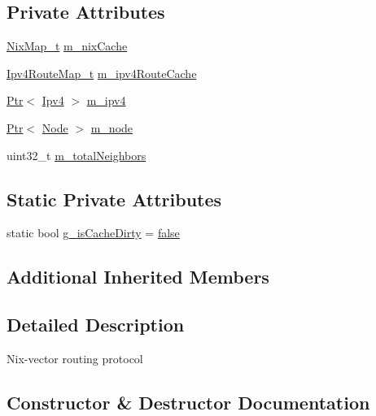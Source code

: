 \subsection*{Private Attributes}
\begin{DoxyCompactItemize}
\item 
\hyperlink{group__nix-vector-routing_gaa552b6157fc91cb632b9007a4cef9bc7}{Nix\+Map\+\_\+t} \hyperlink{classns3_1_1Ipv4NixVectorRouting_a394e830e592aa6ef064be362150219f2}{m\+\_\+nix\+Cache}
\item 
\hyperlink{group__nix-vector-routing_ga0a2084e70cce2de3dcfab5da0ec63bdd}{Ipv4\+Route\+Map\+\_\+t} \hyperlink{classns3_1_1Ipv4NixVectorRouting_aeb85361b66489c60851f72f1493fdee7}{m\+\_\+ipv4\+Route\+Cache}
\item 
\hyperlink{classns3_1_1Ptr}{Ptr}$<$ \hyperlink{classns3_1_1Ipv4}{Ipv4} $>$ \hyperlink{classns3_1_1Ipv4NixVectorRouting_a215cb71f30d85df9ec7176ca22620519}{m\+\_\+ipv4}
\item 
\hyperlink{classns3_1_1Ptr}{Ptr}$<$ \hyperlink{classns3_1_1Node}{Node} $>$ \hyperlink{classns3_1_1Ipv4NixVectorRouting_a329265b09f4d85bac6ec9bd0ec2daa92}{m\+\_\+node}
\item 
uint32\+\_\+t \hyperlink{classns3_1_1Ipv4NixVectorRouting_a96620dedcc6c052265c3c53aa14e4f6b}{m\+\_\+total\+Neighbors}
\end{DoxyCompactItemize}
\subsection*{Static Private Attributes}
\begin{DoxyCompactItemize}
\item 
static bool \hyperlink{classns3_1_1Ipv4NixVectorRouting_a7b75edeb473c9fe1595b59d9800c5bab}{g\+\_\+is\+Cache\+Dirty} = \hyperlink{lte__cqi__generation_8m_ab1bef239d413c4da139c4bac92cd657a}{false}
\end{DoxyCompactItemize}
\subsection*{Additional Inherited Members}


\subsection{Detailed Description}
Nix-\/vector routing protocol 

\subsection{Constructor \& Destructor Documentation}
